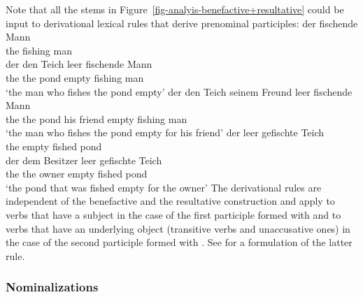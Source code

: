 Note that all the stems in Figure~\ref{fig-analyis-benefactive+resultative} could be input to
derivational lexical rules that derive prenominal participles:
\eal
\ex 
\gll der fischende Mann\\
     the fishing man\\
\ex 
\gll der den Teich leer fischende Mann\\
     the the pond empty fishing man\\
\glt `the man who fishes the pond empty'
\ex 
\gll der den Teich seinem Freund leer fischende Mann\\
     the the pond  his    friend empty fishing man\\
\glt `the man who fishes the pond empty for his friend'
\ex 
\gll der leer gefischte Teich\\
     the empty fished pond\\
\ex 
\gll der dem Besitzer leer gefischte Teich\\
     the the owner    empty fished pond\\
\glt `the pond that was fished empty for the owner'
\zl
The derivational rules are independent of the benefactive and the resultative construction and apply
to verbs that have a subject in the case of the first participle formed with  and to
verbs that have an underlying object (transitive verbs and unaccusative ones) in the case of the
second participle formed with  . See \citet[]{Mueller2002b} for a formulation of
the latter rule. 

\subsubsection{Nominalizations}

